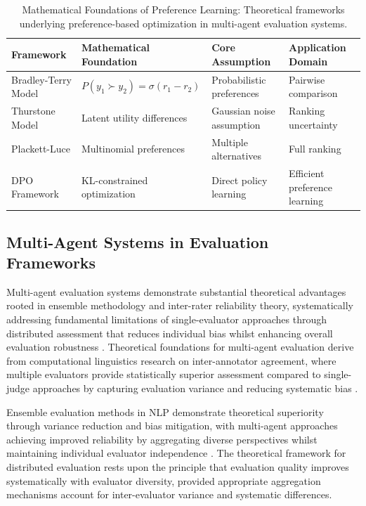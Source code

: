 \begin{table}[H]
\centering
\label{tab:preference_learning_foundations}
\begin{tabular}{p{3.5cm}p{4cm}p{4cm}p{3.5cm}}
\toprule
\textbf{Framework} & \textbf{Mathematical Foundation} & \textbf{Core Assumption} & \textbf{Application Domain} \\
\midrule
Bradley-Terry Model & $P(y_1 \succ y_2) = \sigma(r_1 - r_2)$ & Probabilistic preferences & Pairwise comparison \cite{bradley1952rank_analysis} \\
\midrule
Thurstone Model & Latent utility differences & Gaussian noise assumption & Ranking uncertainty \cite{thurstone1927law_comparative} \\
\midrule
Plackett-Luce & Multinomial preferences & Multiple alternatives & Full ranking \cite{plackett1975analysis_permutations, luce1959individual_choice} \\
\midrule
DPO Framework & KL-constrained optimization & Direct policy learning & Efficient preference learning \cite{rafailov2023dpo} \\
\bottomrule
\end{tabular}
\caption[Mathematical Foundations of Preference Learning]{Mathematical Foundations of Preference Learning: Theoretical frameworks underlying preference-based optimization in multi-agent evaluation systems.}
\end{table}

\subsection{Multi-Agent Systems in Evaluation Frameworks}

Multi-agent evaluation systems demonstrate substantial theoretical advantages rooted in ensemble methodology and inter-rater reliability theory, systematically addressing fundamental limitations of single-evaluator approaches through distributed assessment that reduces individual bias whilst enhancing overall evaluation robustness \cite{artstein2008inter_coder_agreement, krippendorff2004reliability_discourse}. Theoretical foundations for multi-agent evaluation derive from computational linguistics research on inter-annotator agreement, where multiple evaluators provide statistically superior assessment compared to single-judge approaches by capturing evaluation variance and reducing systematic bias \cite{ramos2021multi_annotator}.

Ensemble evaluation methods in NLP demonstrate theoretical superiority through variance reduction and bias mitigation, with multi-agent approaches achieving improved reliability by aggregating diverse perspectives whilst maintaining individual evaluator independence \cite{chan2023chateval, talebirad2023multiagent_collaboration}. The theoretical framework for distributed evaluation rests upon the principle that evaluation quality improves systematically with evaluator diversity, provided appropriate aggregation mechanisms account for inter-evaluator variance and systematic differences.


